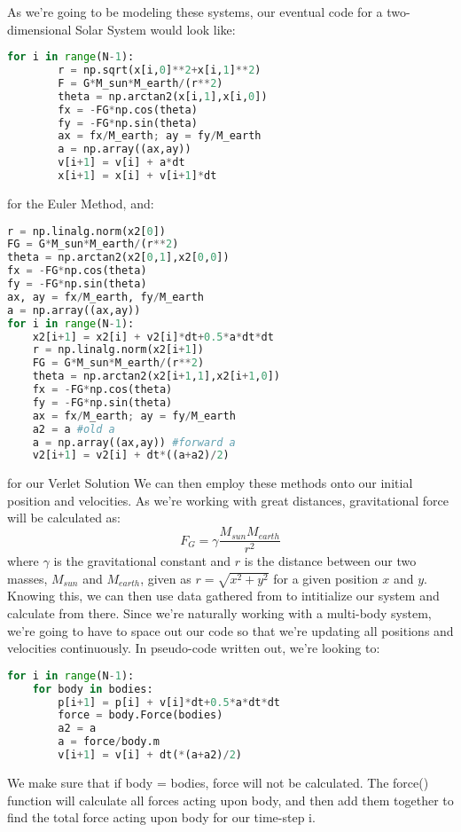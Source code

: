 \documentclass{article}
\begin{document}
As we're going to be modeling these systems, our eventual code for a two-dimensional Solar System would look like:
\newpage
\begin{lstlisting}[language=Python]
for i in range(N-1):
        r = np.sqrt(x[i,0]**2+x[i,1]**2)
        F = G*M_sun*M_earth/(r**2)
        theta = np.arctan2(x[i,1],x[i,0])
        fx = -FG*np.cos(theta)
        fy = -FG*np.sin(theta)
        ax = fx/M_earth; ay = fy/M_earth
        a = np.array((ax,ay))
        v[i+1] = v[i] + a*dt
        x[i+1] = x[i] + v[i+1]*dt
\end{lstlisting}
for the Euler Method, and:
\begin{lstlisting}[language=Python]
r = np.linalg.norm(x2[0])
FG = G*M_sun*M_earth/(r**2)
theta = np.arctan2(x2[0,1],x2[0,0])
fx = -FG*np.cos(theta)
fy = -FG*np.sin(theta)
ax, ay = fx/M_earth, fy/M_earth
a = np.array((ax,ay))
for i in range(N-1):
    x2[i+1] = x2[i] + v2[i]*dt+0.5*a*dt*dt
    r = np.linalg.norm(x2[i+1])
    FG = G*M_sun*M_earth/(r**2)
    theta = np.arctan2(x2[i+1,1],x2[i+1,0])
    fx = -FG*np.cos(theta)
    fy = -FG*np.sin(theta)
    ax = fx/M_earth; ay = fy/M_earth
    a2 = a #old a
    a = np.array((ax,ay)) #forward a
    v2[i+1] = v2[i] + dt*((a+a2)/2)
\end{lstlisting}
for our Verlet Solution
\newline We can then employ these methods onto our initial position and velocities. \newline
As we're working with great distances, gravitational force will be calculated as:
\begin{equation}
    F_G = \gamma \frac{M_{sun}M_{earth}}{r^2}
\end{equation}
where $\gamma$ is the gravitational constant and $r$ is the distance between our two masses, $M_{sun}$ and $M_{earth}$, given as $r = \sqrt{x^2 + y^2}$ for a given position $x$ and $y$. \newline
Knowing this, we can then use data gathered from \cite{NASA} to intitialize our system and calculate from there. Since we're naturally working with a multi-body system, we're going to have to space out our code so that we're updating all positions and velocities continuously.
\newpage
In pseudo-code written out, we're looking to:
\begin{lstlisting}[language=Python]
for i in range(N-1):
    for body in bodies:
        p[i+1] = p[i] + v[i]*dt+0.5*a*dt*dt
        force = body.Force(bodies)
        a2 = a
        a = force/body.m
        v[i+1] = v[i] + dt(*(a+a2)/2)
\end{lstlisting}
We make sure that if body = bodies, force will not be calculated. \newline
The force() function will calculate all forces acting upon body, and then add them together to find the total force acting upon body for our time-step i. \newline
\end{document}
